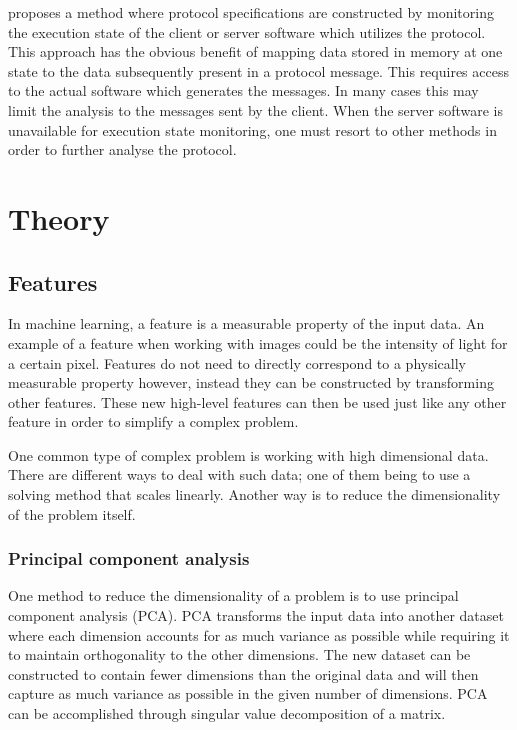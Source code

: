 \documentclass[a4paper]{report}
\begin{document}
\citet{caballero12} proposes a method where protocol specifications are
constructed by monitoring the execution state of the client or server software
which utilizes the protocol. This approach has the obvious benefit of mapping
data stored in memory at one state to the data subsequently present in a
protocol message. This requires access to the actual software which generates
the messages. In many cases this may limit the analysis to the messages sent by
the client. When the server software is unavailable for execution state
monitoring, one must resort to other methods in order to further analyse the
protocol.

\chapter{Theory}

\section{Features}
In machine learning, a feature is a measurable property of the input data. An
example of a feature when working with images could be the intensity of light
for a certain pixel. Features do not need to directly correspond to a
physically measurable property however, instead they can be constructed by
transforming other features. These new high-level features can then be used
just like any other feature in order to simplify a complex problem.

One common type of complex problem is working with high dimensional data. There
are different ways to deal with such data; one of them being to use a solving
method that scales linearly. Another way is to reduce the dimensionality of the
problem itself.

\subsection{Principal component analysis}
One method to reduce the dimensionality of a problem is to use principal
component analysis (PCA). PCA transforms the input data into another dataset
where each dimension accounts for as much variance as possible while requiring
it to maintain orthogonality to the other dimensions. The new dataset can be
constructed to contain fewer dimensions than the original data and will then
capture as much variance as possible in the given number of dimensions. PCA can
be accomplished through singular value decomposition of a matrix.
\end{document}

